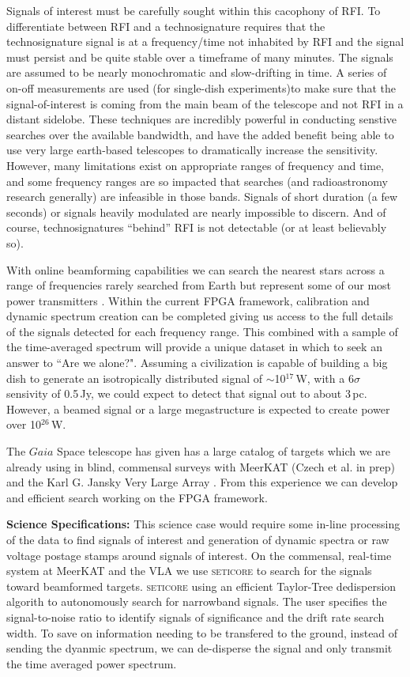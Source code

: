 Signals of interest must be carefully sought within this cacophony of RFI. To differentiate between RFI and a technosignature requires that the technosignature signal is at a frequency/time not inhabited by RFI and the signal must persist and be quite stable over a timeframe of many minutes.  The signals are assumed to be nearly monochromatic and slow-drifting in time.  A series of on-off measurements are used (for single-dish experiments)to make sure that the signal-of-interest is coming from the main beam of the telescope and not RFI in a distant sidelobe.  These techniques are incredibly powerful in conducting senstive searches over the available bandwidth, and have the added benefit being able to use very large earth-based telescopes to dramatically increase the sensitivity.  However, many limitations exist on appropriate ranges of frequency and time, and some frequency ranges are so impacted that searches (and radioastronomy research generally) are infeasible in those bands.  Signals of short duration (a few seconds) or signals heavily modulated are nearly impossible to discern.  And of course, technosignatures ``behind'' RFI is not detectable (or at least believably so).

With online beamforming capabilities we can search the nearest stars  across a range of frequencies rarely searched from Earth but represent some of our most power transmitters \citep{Tremblay_2022}. Within the current FPGA framework, calibration and dynamic spectrum creation can be completed giving us access to the full details of the signals detected for each frequency range. This combined with a sample of the time-averaged spectrum will provide a unique dataset in which to seek an answer to ``Are we alone?". Assuming a civilization is capable of building a big dish to generate an isotropically distributed signal of $\sim$10${^17}$\,W, with a 6$\sigma$ sensivity of 0.5\,Jy, we could expect to detect that signal out to about 3\,pc. However, a beamed signal or a large megastructure is expected to create power over 10$^{26}$\,W. 

The $Gaia$ Space telescope has given has a large catalog of targets which we are already using in blind, commensal surveys with MeerKAT (Czech et al. in prep) and the Karl G. Jansky Very Large Array \citep{Tremblay_2024}. From this experience we can develop and efficient search working on the FPGA framework.

\textbf{Science Specifications:} This science case would require some in-line processing of the data to find signals of interest and generation of dynamic spectra or raw voltage postage stamps around signals of interest. On the commensal, real-time system at MeerKAT and the VLA we use \textsc{seticore} to search for the signals toward beamformed targets. \textsc{seticore} using an efficient Taylor-Tree dedispersion algorith to autonomously search for narrowband signals. The user specifies the signal-to-noise ratio to identify signals of significance and the drift rate search width. To save on information needing to be transfered to the ground, instead of sending the dyanmic spectrum, we can de-disperse the signal and only transmit the time averaged power spectrum. 

